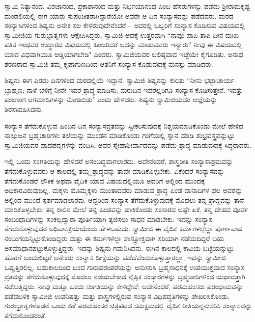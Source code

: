 ಸ್ವಾಮಿ ನಿತ್ಯಾನಂದ, ವಿರಜಾನಂದ, ಪ್ರಕಾಶಾನಂದ ಮತ್ತು ನಿರ್ಭಯಾನಂದ ಎಂಬ ಹೆಸರುಗಳನ್ನು ಪಡೆದು ಶ‍್ರೀರಾಮಕೃಷ್ಟ ಮಂಡಲಿಯಲ್ಲಿ ಈಗ ಯಾರು ಸುಪರಿಚಿತರಾಗಿದ್ದಾರೆಯೋ ಅವರೇ ಆ ದಿನ ಸಂನ್ಯಾಸವನ್ನು ಪಡೆದವರು. ಮಠದ ಸಂನ್ಯಾಸಿಗಳಿಂದ ಶಿಷ್ಯನು ಅನೇಕ ಸಲ ಕೇಳಿರುವುದೇನೆಂದರೆ – ಅವರಲ್ಲಿ ಒಬ್ಬರಿಗೆ ಸಂನ್ಯಾಸ ಕೊಡಿಸುವ ವಿಷಯದಲ್ಲಿ ಸ್ವಾಮೀಜಿಯ ಗುರುಭ್ರಾತೃಗಳು ಆಕ್ಷೇಪಿಸಿದ್ದರು. ಸ್ವಾಮಿಜಿ ಅದಕ್ಕೆ ಉತ್ತರವಾಗಿ “ನಾವೂ ಪಾಪಿ ತಾಪಿ ದೀನ ದುಃಖ ಪತಿತ ಇಂಥವರ ಉದ್ಧಾರದ ವಿಷಯದಲ್ಲಿ ಹಿಂಜರಿದರೆ ಅದನ್ನು ಮಾಡುವವರು ಇನ್ಯಾರು? ನೀವು ಈ ವಿಷಯದಲ್ಲಿ ಯಾವ ವಿಧವಾಗಿಯೂ ಅಡ್ಡಿಯಾಗಬೇಡಿ" ಎಂದರು. ಸ್ವಾಮಿಜಿಯವರ ಬಲಿಷ್ಠವಾದ ಇಚ್ಛೆಯೇ ಕೈಗೂಡಿತು. ಅನಾಥ ಶರಣರಾದ ಸ್ವಾಮಿಜಿ ತಮ್ಮ ಕೃಪಾಗುಣದಿಂದ ಆತನಿಗೆ ಸಂನ್ಯಾಸ ಕೊಡುವುದಕ್ಕೆ ಮನಸ್ಸು ಮಾಡಿದರು.

ಶಿಷ್ಯನು ಈಗ ಎರಡು ದಿನಗಳಿಂದ ಮಠದಲ್ಲಿಯೆ ಇದ್ದಾನೆ. ಸ್ವಾಮಿಜಿ ಶಿಷ್ಯನನ್ನು ಕುರಿತು “ನೀನು ಭಟ್ಟಾಚಾರ್ಯ ಬ್ರಾಹ್ಮಣ; ನಾಳೆ ಬೆಳಿಗ್ಗೆ ನೀನೇ ಇವರ ಶ್ರಾದ್ಧ ಮಾಡಿಸು; ಮರುದಿನ ಇವರೆಲ್ಲರಿಗೂ ಸಂನ್ಯಾಸ ಕೊಡಿಸುತ್ತೇನೆ. ಇವತ್ತು ಪಂಚಾಂಗ ಆಗಮಾದಿಗಳನ್ನು ನೋಡಿಬಿಡು" ಎಂದು ಹೇಳಿದರು. ಶಿಷ್ಯನು ಸ್ವಾಮಿಜಿಯವರ ಆಜ್ಞೆಯನ್ನು ಶಿರಸಾವಹಿಸಿದನು.

ಸಂನ್ಯಾಸ ತೆಗೆದುಕೊಳ್ಳುವ ಹಿಂದಿನ ದಿನ ಸಂನ್ಯಾಸವ್ರತವನ್ನು ಸ್ವೀಕರಿಸುವುದಕ್ಕೆ ನಿಶ್ಚಯಮಾಡಿಕೊಂಡು ಮೇಲೆ ಹೇಳಿದ ನಾಲ್ಕುಜನ ಬ್ರಹ್ಮಚಾರಿಗಳು ತಲೆಯನ್ನು ಮುಂಡನ ಮಾಡಿಕೊಂಡು ಗಂಗೆಯಲ್ಲಿ ಸ್ನಾನ ಮಾಡಿ ಶುಭ್ರವಸ್ತ್ರವನ್ನುಟ್ಟು ಸ್ವಾಮಿಜಿಯವರ ಪಾದಪದ್ಮಗಳನ್ನು ವಂದಿಸಿ, ಅವರ ಸ್ನೇಹಾಶೀರ್ವಾದವನ್ನು ಪಡೆದು ಶ್ರಾದ್ಧ ಮಾಡುವುದಕ್ಕೆ ಸಿದ್ಧರಾದರು.

ಇಲ್ಲಿ ಒಂದು ಸಂಗತಿಯನ್ನು ಹೇಳಿದರೆ ಅಸಂಬದ್ಧವಾಗಲಾರದು. ಅದೇನೆಂದರೆ, ಶಾಸ್ತ್ರರೀತಿ ಸಂನ್ಯಾಸಾಶ್ರಮವನ್ನು ತೆಗೆದುಕೊಳ್ಳುವವರು ಆ ಕಾಲದಲ್ಲಿ ತಮ್ಮ ಶ್ರಾದ್ಧವನ್ನು ತಾವೇ ಮಾಡಿಕೊಳ್ಳಬೇಕು. ಏಕೆಂದರೆ ಸಂನ್ಯಾಸವನ್ನು ತೆಗೆದುಕೊಂಡರೆ ಲೌಕಿಕ ಅಥವಾ ವೈದಿಕ ಯಾವ ವಿಷಯದಲ್ಲಿಯೂ ಅವರಿಗೆ ಅಲ್ಲಿಂದ ಮುಂದಕ್ಕೆ ಅಧಿಕಾರವಿರುವುದಿಲ್ಲ. ಮಕ್ಕಳು ಮೊಮ್ಮಕ್ಕಳು ಮುಂತಾದವರು ಮಾಡುವ ಶ್ರಾದ್ಧ ಪಿಂಡ ದಾನಾದಿಗಳ ಫಲ ಅವರನ್ನು ಅಲ್ಲಿಂದ ಮುಂದೆ ಸ್ಪರ್ಶಮಾಡಲಾರವು. ಆದ್ದರಿಂದ ಸಂನ್ಯಾಸ ತೆಗೆದುಕೊಳ್ಳುವುದಕ್ಕೆ ಮೊದಲು ತನ್ನ ಶ್ರಾದ್ಧವನ್ನು ತಾನೆ ಮಾಡಿಕೊಳ್ಳಬೇಕು; ತನ್ನ ಕಾಲಿನ ಮೇಲೆ ತನ್ನ ಪಿಂಡವನ್ನು ಹಾಕಿಕೊಂಡು ಸಂಸಾರದ ಅಷ್ಟೇ ಏಕೆ, ತನ್ನ ದೇಹದ ಪೂರ್ವ ಸಂಬಂಧಾದಿಗಳನ್ನು ಸಂಕಲ್ಪದ್ವಾರಾ ಪೂರ್ತಿಯಾಗಿ ತ್ಯಜಿಸಲು ಸಾಧನ ಮಾಡಬೇಕು. ಇದನ್ನು ಸಂನ್ಯಾಸ ತೆಗೆದುಕೊಳ್ಳುವುದರ ಅಧಿವಾಸಕ್ರಿಯೆಯೆಂದು ಹೇಳಬಹುದು. ಸ್ವಾಮೀಜಿ ಈ ವೈದಿಕ ಕರ್ಮಗಳಲ್ಲೆಲ್ಲಾ ಪೂರ್ಣವಾದ ನಂಬುಗೆಯನ್ನಿಟ್ಟುಕೊಂಡಿದ್ದರು ಮತ್ತು ಈ ಕರ್ಮಗಳೆಲ್ಲಾ ಶಾಸ್ತ್ರೋಕ್ತವಾಗಿ ಸರಿಯಾಗಿ ನಡೆಯದಿದ್ದರೆ ಬಹು ಅಸಮಾಧಾನಪಟ್ಟುಕೊಳ್ಳುತ್ತಿದ್ದರು. ಇದನ್ನು ಶಿಷ್ಯನು ಗಮನಿಸಿದನು. ಈಗಿನ ಕಾಲದಲ್ಲಿ ಕಾವಿಯ ಬಟ್ಟೆಯನ್ನುಟ್ಟು ಹೊರಗೆ ಬಂದುಬಿಟ್ಟರೆ ಅನೇಕರು ಸಂನ್ಯಾಸ ದೀಕ್ಷೆಯನ್ನು ಪಡೆದೆವೆಂದುಕೊಳ್ಳುತ್ತಾರಲ್ಲಾ, ಇದನ್ನು ಸ್ವಾಮೀಜಿ ಒಪ್ಪುತ್ತಿರಲಿಲ್ಲ. ಬಹುಕಾಲದಿಂದ ಬಂದ ಗುರುಪರಂಪರೆಯನ್ನು ಅನುಸರಿಸಿ ಬ್ರಹ್ಮಸಾಧನಕ್ಕೆ ಉಪಯುಕ್ತವಾದ ಸಂನ್ಯಾಸ ವ್ರತವನ್ನು ತೆಗೆದುಕೊಳ್ಳುವುದಕ್ಕೆ ಮೊದಲು ನಡೆಯಬೇಕಾದ ನೈಷ್ಠಿಕ ಸಂಸ್ಕಾರಗಳನ್ನು ಬ್ರಹ್ಮಚಾರಿಗಳಿಂದ ಯಥಾವತ್ತಾಗಿ ನಡೆಸುತ್ತಿದ್ದರು. ನಾವು ಮತ್ತೂ ಒಂದು ಸಂಗತಿಯನ್ನು ಕೇಳಿದ್ದೇವೆ; ಅದೇನೆಂದರೆ, ಪರಮಹಂಸರು ಪರಂಧಾಮವನ್ನು ಪಡೆದಬಳಿಕ ಸ್ವಾಮೀಜಿ ಉಪನಿಷತ್ತು ಮತ್ತು ಶಾಸ್ತ್ರಗಳಲ್ಲಿರುವ ಸಂನ್ಯಾಸ ವಿಧಿಪದ್ಧತಿಗಳನ್ನು ಶೇಖರಿಸಿಕೊಂಡು, ಗುರುಭ್ರಾತೃಗಳೊಡನೆ ಒಂದು ಕಡೆ ಪರಮಹಂಸರ ಚಿತ್ರಪಟದ ಸಮಕ್ಷಮದಲ್ಲಿ ವೈದಿಕ ರೀತಿಯನ್ನನುಸರಿಸಿ ಸಂನ್ಯಾಸವನ್ನು ತೆಗೆದುಕೊಂಡರಂತೆ.

